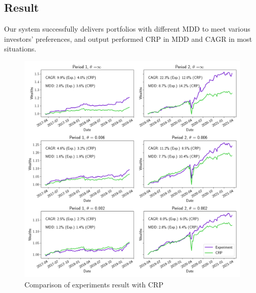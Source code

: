 \subsection{Result}
Our system successfully delivers portfolios with different MDD to meet various investors' preferences, and output performed CRP in MDD and CAGR in most situations.





\begin{figure}[htb]
\centering
  \includegraphics[width=16cm]{images/crp_compare.png}
  \caption [Comparison of experiments result with CRP]{Comparison of experiments result with CRP}
  \label{fig:crp_compare}
\end{figure}

